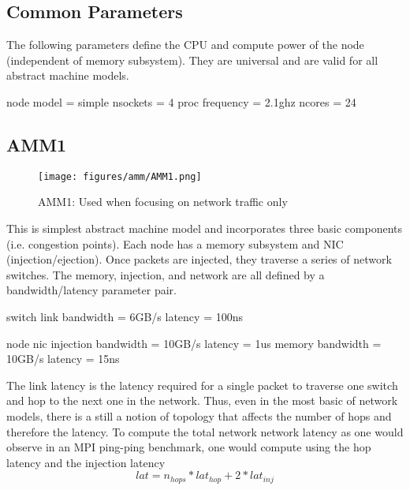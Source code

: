 \subsection{Common Parameters}
\label{subsec:commonParams}
The following parameters define the CPU and compute power of the node (independent of memory subsystem).
They are universal and are valid for all abstract machine models. 

\begin{ViFile}
node {
 model = simple
 nsockets = 4
 proc {
  frequency = 2.1ghz
  ncores = 24
 }
}
\end{ViFile}

\subsection{AMM1}
\label{subsec:ammOne}

\begin{figure}[h!]
\begin{center}
\texttt{[image: figures/amm/AMM1.png]}
\end{center}
\caption{AMM1: Used when focusing on network traffic only}
\label{fig:amm1}
\end{figure}

This is simplest abstract machine model and incorporates three basic components (i.e. congestion points).
Each node has a memory subsystem and NIC (injection/ejection).
Once packets are injected, they traverse a series of network switches.
The memory, injection, and network are all defined by a bandwidth/latency parameter pair.

\begin{ViFile}
switch {
 link {
  bandwidth = 6GB/s
  latency = 100ns
 }
}

node {
 nic {
  injection {
   bandwidth = 10GB/s
   latency = 1us  
  }
 }
 memory {
  bandwidth = 10GB/s
  latency = 15ns
 }
}


\end{ViFile}


The link latency is the latency required for a single packet to traverse one switch and hop to the next one in the network.
Thus, even in the most basic of network models, there is a still a notion of topology that affects the number of hops and therefore the latency.
To compute the total network network latency as one would observe in an MPI ping-ping benchmark, one would compute using the hop latency and the injection latency
\[
lat = n_{hops} * lat_{hop} + 2*lat_{inj}
\]


